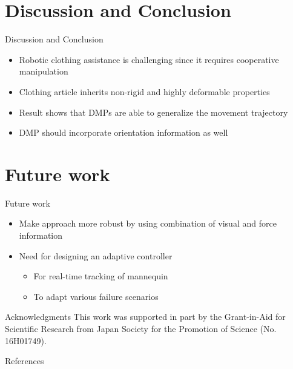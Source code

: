 \documentclass[aspectratio=43,11pt,xcolor={dvipsnames}]{beamer}
\begin{document}
\section{Discussion and Conclusion}
\begin{frame}{Discussion and Conclusion}
	\linespread{1.5}
			
	\begin{itemize}
		\item Robotic clothing assistance is challenging since it requires cooperative manipulation
		\item Clothing article inherits non-rigid and highly deformable properties
		\item Result shows that DMPs are able to generalize the movement trajectory
		\item DMP should incorporate orientation information as well
	\end{itemize}
\end{frame}

\section{Future work}
\begin{frame}{Future work}
	\linespread{1.5}
			
	\begin{itemize}
		\item Make approach more robust by using combination of visual and force information
		\item Need for designing an adaptive controller
		      \begin{itemize}
		      	\item For real-time tracking of mannequin
		      	\item To adapt various failure scenarios
		      \end{itemize}
	\end{itemize}
			
	\begin{exampleblock}{Acknowledgments}
		This work was supported in part by the Grant-in-Aid for Scientific Research from Japan Society for the Promotion of Science (No. 16H01749).
	\end{exampleblock}
\end{frame}

\begin{frame}[noframenumbering]{References}
	\nocite{*}
	\hspace*{0.5cm}
	\begin{minipage}{\dimexpr\textwidth-1cm\relax}
		\printbibliography
	\end{minipage}
\end{frame}
\end{document}
